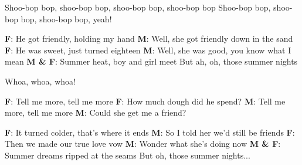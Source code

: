 \begin{verse*}
Shoo-bop bop, shoo-bop bop, shoo-bop bop, shoo-bop bop
Shoo-bop bop, shoo-bop bop, shoo-bop bop, yeah!
\end{verse*}

\begin{verse*}
\textbf{F}: He got friendly, holding my hand
\textbf{M}: Well, she got friendly down in the sand
\textbf{F}: He was sweet, just turned eighteen
\textbf{M}: Well, she was good, you know what I mean
\textbf{M \& F}: Summer heat, boy and girl meet
But ah, oh, those summer nights
\end{verse*}

\begin{verse*}
Whoa, whoa, whoa!
\end{verse*}

\begin{verse*}
\textbf{F}: Tell me more, tell me more
\textbf{F}: How much dough did he spend?
\textbf{M}: Tell me more, tell me more
\textbf{M}: Could she get me a friend?
\end{verse*}

\begin{verse*}
\textbf{F}: It turned colder, that's where it ends
\textbf{M}: So I told her we'd still be friends
\textbf{F}: Then we made our true love vow
\textbf{M}: Wonder what she's doing now
\textbf{M \& F}: Summer dreams ripped at the seams
But oh, those summer nights...
\end{verse*}
